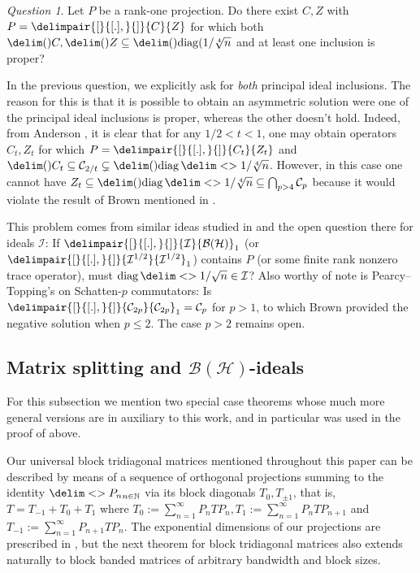 \documentclass[10pt,reqno]{amsart}
\theoremstyle{remark}
\newtheorem{question}{Question}
\newcommand{\BH}{\mathcal{B}(\Hil)}
\newcommand{\Hil}{\mathcal{H}}
\DeclareMathOperator{\diag}{diag}
\newcommand{\seq}{\delim<>}
\newcommand{\ideal}{\delim()}
\newcommand{\comm}{\delimpair{[}{[.],}{]}}
\newcommand{\I}{\mathcal{I}}
\newcommand{\schatten}[1]{\mathcal{C}_{#1}}
\numberwithin{equation}{section}
\begin{document}
\begin{question}
  \label{que:anderson-minimal}
  Let $P$ be a rank-one projection.
  Do there exist $C,Z$ with $P = \comm{C}{Z}$ for which both $\ideal{C},\ideal{Z} \subseteq \ideal{\diag(1/\sqrt[4]{n}}$ and at least one inclusion is proper?
\end{question}

In the previous question, we explicitly ask for \emph{both} principal ideal inclusions.
The reason for this is that it is possible to obtain an asymmetric solution were one of the principal ideal inclusions is proper, whereas the other doesn't hold.
Indeed, from Anderson \cite[Theorem~3]{And-1977-JRAM}, it is clear that for any $1/2 < t < 1$, one may obtain operators $C_t,Z_t$ for which $P = \comm{C_t}{Z_t}$ and $\ideal{C_t} \subseteq \schatten{2/t} \subsetneq \ideal{\diag\seq{1/\sqrt[4]{n}}}$.
However, in this case one cannot have $Z_t \subseteq \ideal{\diag\seq{1/\sqrt[4]{n}}} \subseteq \bigcap_{p > 4} \schatten{p}$ because it would violate the result of Brown \cite{Bro-1994-JRAM} mentioned in .

This problem comes from similar ideas studied in \cite[Section 7]{DFWW-2004-AM} and the open question there for ideals $\I$: If $\comm{\I}{ \BH}_1$ (or $\comm{\I^{1/2}}{ \I^{1/2}}_1$) contains $P$ (or some finite rank nonzero trace operator), must $\diag\seq{1/\sqrt{n}} \in  \I$?
Also worthy of note is Pearcy--Topping's \cite[Problem 2]{PT-1971-MMJ} on Schatten-$p$ commutators: Is $\comm{\schatten{2p}}{ \schatten{2p}}_1 = \schatten{p}$ for $p >1$, to which Brown provided the negative solution \cite{Bro-1994-JRAM} when $p \leq 2$.
The case $p > 2$ remains open.

\subsection*{Matrix splitting and $\BH$-ideals}

For this subsection we mention two special case theorems whose much more general versions are in  \cite[Theorems 4 and 8]{LW-2021-OM} auxiliary to this work, and  in particular was used in the proof of  above.

Our universal block tridiagonal matrices mentioned throughout this paper can be described by means of a sequence of orthogonal projections summing to the identity $\seq{P_n}_{n \in \mathbb{N}}$ via its block diagonals $T_0, T_{\pm 1}$, that is, $T = T_{-1}+T_0+T_1$ where $T_0 := \sum_{n=1}^\infty P_nTP_n, T_1 := \sum_{n=1}^\infty P_nTP_{n+1}$ and $T_{-1} := \sum_{n=1}^\infty P_{n+1}TP_n$.
The exponential dimensions of our projections are prescribed in , but the next theorem for block tridiagonal matrices also extends naturally to block banded matrices of arbitrary bandwidth and block sizes.
\end{document}
